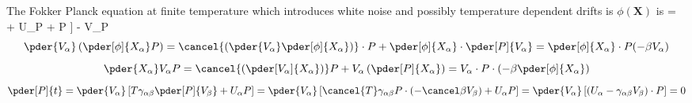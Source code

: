 The Fokker Planck equation at finite temperature which introduces white noise and possibly temperature dependent drifts is $\phi(\mathbf{X})$ is 
\beq {} =  \left[ T \gamma_{\alpha\beta} \pder[P]{V_\beta} + U_\alpha P +  P \right] -  V_\alpha P   \eeq
{}
$$ \pder{V_\alpha} \left( \pder[\phi]{X_\alpha} P \right) = \cancel{ \left( \pder{V_\alpha} \pder[\phi]{X_\alpha} \right) } \cdot P + \pder[\phi]{X_\alpha} \cdot \pder[P]{V_\alpha} = \pder[\phi]{X_\alpha} \cdot P (-\beta V_\alpha) $$
$$ \pder{X_\alpha} V_\alpha P = \cancel{ \left( \pder[V_\alpha]{X_\alpha} \right) } P + V_\alpha \left( \pder[P]{X_\alpha} \right) = V_\alpha \cdot P \cdot \left( -\beta \pder[\phi]{X_\alpha} \right) $$
$$ \pder[P]{t} = \pder{V_\alpha} \left[ T \gamma_{\alpha\beta} \pder[P]{V_\beta} + U_\alpha P \right] = \pder{V_\alpha} \left[ \cancel{T} \gamma_{\alpha\beta} P \cdot (- \cancel\beta V_\beta) + U_\alpha P \right] = \pder{V_\alpha} \left[ (U_\alpha - \gamma_{\alpha\beta} V_\beta) \cdot P \right] = 0 $$

